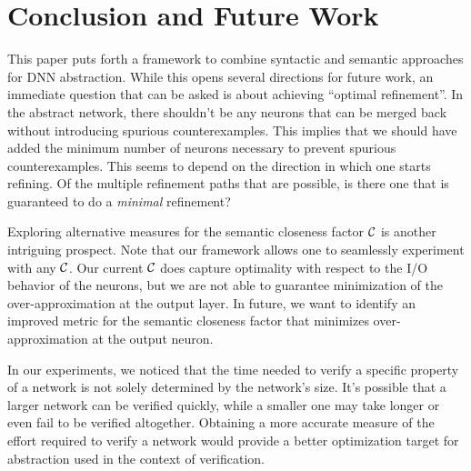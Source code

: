 \section{Conclusion and Future Work}

This paper puts forth a framework to combine syntactic and semantic approaches
for DNN abstraction. While this opens several directions for future work, an
immediate question that can be asked is about achieving ``optimal refinement''.
In the abstract network, there shouldn't be any neurons that can be merged back
without introducing spurious counterexamples. This implies that we should have
added the minimum number of neurons necessary to prevent spurious
counterexamples. This seems to depend on the direction in which one starts
refining. Of the multiple refinement paths that are possible, is there one that
is guaranteed to do a \emph{minimal} refinement?

Exploring alternative measures for the semantic closeness factor $\mathcal{C}$ is
another intriguing prospect. Note that our framework allows one to seamlessly
experiment  with any $\mathcal{C}$.  Our current $\mathcal{C}$ does capture optimality with
respect to the I/O behavior of the neurons, but we are not able to guarantee
minimization of the over-approximation at the output layer. In future, we want
to identify an improved metric for the semantic closeness factor that minimizes
over-approximation at the output neuron. 

In our experiments, we noticed that the time needed to verify a specific
property of a network is not solely determined by the network's size. It's
possible that a larger network can be verified quickly, while a smaller one may
take longer or even fail to be verified altogether. Obtaining a more accurate
measure of the effort required to verify a network would provide a better
optimization target for abstraction used in the context of verification.



